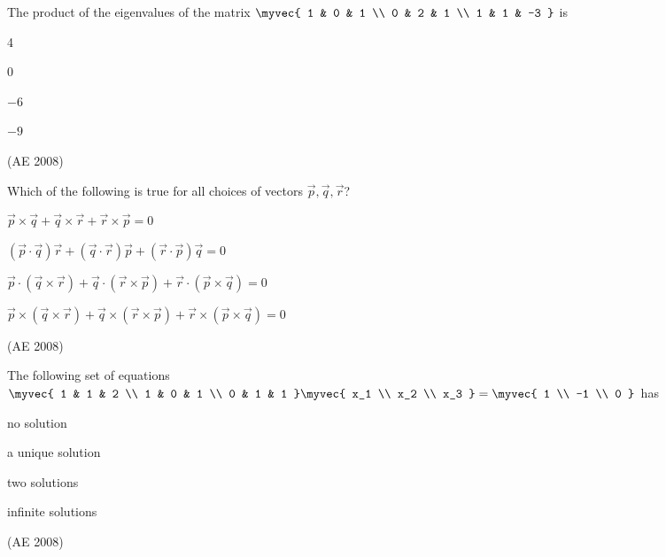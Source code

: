 \item The product of the eigenvalues of the matrix
$
\myvec{
1 & 0 & 1 \\
0 & 2 & 1 \\
1 & 1 & -3
}
$
is 
\begin{enumerate}
\begin{multicols}{4}
    

\item 4  \item 0  \item $-6$  \item $-9$
\end{multicols}
\end{enumerate}
\hfill(AE 2008)
    \item Which of the following is true for all choices of vectors $\vec{p}, \vec{q}, \vec{r}$?
    \begin{enumerate}
    \begin{multicols}{2}
        \item $\vec{p} \times \vec{q} + \vec{q} \times \vec{r} + \vec{r} \times \vec{p} = 0$
        \item $(\vec{p} \cdot \vec{q}) \vec{r} + (\vec{q} \cdot \vec{r}) \vec{p} + (\vec{r} \cdot \vec{p}) \vec{q} = 0$
        \item $\vec{p} \cdot (\vec{q} \times \vec{r}) + \vec{q} \cdot (\vec{r} \times \vec{p}) + \vec{r} \cdot (\vec{p} \times \vec{q}) = 0$
        \item $\vec{p} \times (\vec{q} \times \vec{r}) + \vec{q} \times (\vec{r} \times \vec{p}) + \vec{r} \times (\vec{p} \times \vec{q}) = 0$
        \end{multicols}
    \end{enumerate}
    \hfill(AE 2008)
        \item The following set of equations
    $
    \myvec{
    1 & 1 & 2 \\
    1 & 0 & 1 \\
    0 & 1 & 1 
    }
    \myvec{
    x_1 \\
    x_2 \\
    x_3
    }
    =
    \myvec{
    1 \\
    -1 \\
    0
    }
    $
    has
    \begin{enumerate}
    \begin{multicols}{2}
        \item no solution
        \item a unique solution
        \item two solutions
        \item infinite solutions
        \end{multicols}
    \end{enumerate}
    \hfill(AE 2008)
